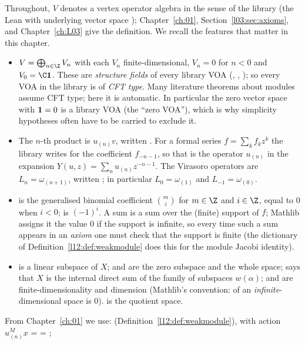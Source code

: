 Throughout, $V$ denotes a vertex operator algebra in the sense of the library (the Lean
 with underlying vector space ); Chapter~\ref{ch:01},
Section~\ref{l03:sec:axioms}, and Chapter~\ref{ch:L03} give the definition. We recall the features that
matter in this chapter.
\begin{itemize}
\item $V = \bigoplus_{n\in\Z}V_n$ with each $V_n$ finite-dimensional, $V_n = 0$ for $n<0$ and
  $V_0 = \C\ltwelvevac$. These are \emph{structure fields} of every library VOA
  (, , ); so every VOA in the library is of
  \emph{CFT type}. Many literature theorems about modules assume CFT type; here it is automatic. In
  particular the zero vector space with $\mathbf{1} = 0$ is a library VOA (the ``zero VOA''), which
  is why simplicity hypotheses often have to be carried to exclude it.
\item The $n$-th product is $u_{(n)}v$, written . For a formal series
  $f = \sum_k f_k z^k$ the library writes  for the coefficient
  $f_{-n-1}$, so that  is the operator $u_{(n)}$ in the expansion
  $Y(u,z) = \sum_n u_{(n)}z^{-n-1}$. The Virasoro operators are
  $L_n = \omega_{(n+1)}$, written ; in particular $L_0 = \omega_{(1)}$ and
  $L_{-1} = \omega_{(0)}$.
\item {} is the generalised binomial coefficient $\binom mi$ for $m\in\Z$ and $i\in\Z$, equal to
  $0$ when $i<0$;  is $(-1)^i$. A sum  is a sum over the (finite)
  support of $f$; Mathlib assigns it the value $0$ if the support is infinite, so every time such a
  sum appears in an \emph{axiom} one must check that the support is finite (the dictionary of
  Definition~\ref{l12:def:weakmodule} does this for the module Jacobi identity).
\item {} is a linear subspace of $X$;  and  are the zero subspace
  and the whole space;  says that $X$ is the internal direct sum of the
  family of subspaces $w(\alpha)$;  and  are
  finite-dimensionality and dimension (Mathlib's convention:  of an
  \emph{infinite}-dimensional space is $0$).  is the quotient space.
\end{itemize}
From Chapter~\ref{ch:01} we use:  (Definition~\ref{l12:def:weakmodule}), with
action $u^M_{(n)}x$ =  = ; 
